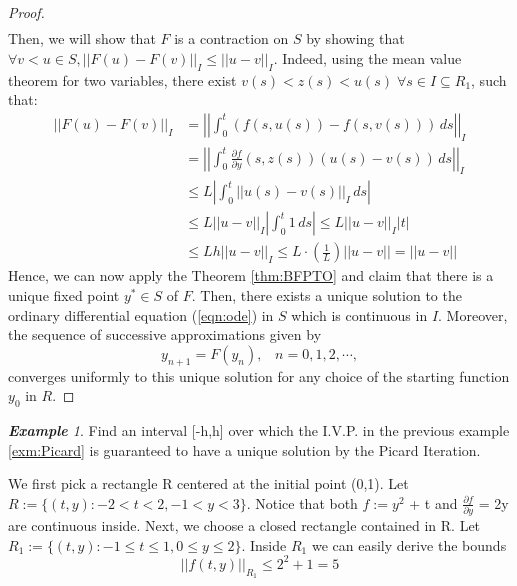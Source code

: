 \documentclass{article}
\theoremstyle{definition}
\theoremstyle{remark}
\theoremstyle{example}
\newtheorem{example}{\textbf{Example}}[section]
\begin{document}
\begin{proof}
\begin{align}
    \end{align}
    Then, we will show that $F$ is a contraction on $S$ by showing that $\forall v < u \in S, \lvert\lvert F(u) - F(v) \rvert\rvert_I \leq \lvert\lvert u - v \rvert\rvert_I$. Indeed, using the mean value theorem for two variables, there exist $v(s) < z(s) < u(s) \; \forall s \in I \subseteq R_1$, such that:
    \begin{align}
        \lvert\lvert F(u) - F(v) \rvert\rvert_I & = \left\lvert\left\lvert \int_{0}^{t}{(f(s,u(s)) - f(s,v(s))) \,ds} \right\rvert\right\rvert_I\\
        & = \left\lvert\left\lvert \int_{0}^{t}\tfrac{\partial f}{\partial y}(s,z(s)){(u(s) - v(s))} \,ds \right\rvert\right\rvert_I\\
        & \leq L\left\lvert\int_{0}^{t}{\lvert\lvert u(s) - v(s) \rvert\rvert_I \,ds}\right\rvert\\
        & \leq L\lvert\lvert u - v \rvert\rvert_{I} \left\lvert \int_{0}^{t}{1}\,ds \right\rvert \leq L\lvert\lvert u - v \rvert\rvert_{I}\lvert t \rvert\\
        & \leq Lh\lvert\lvert u - v \rvert\rvert_{I} \leq L \cdot(\tfrac{1}{L})\lvert\lvert u - v \rvert\rvert = \lvert\lvert u - v \rvert\rvert
    \end{align}
    Hence, we can now apply the Theorem \ref{thm:BFPTO} and claim that there is a unique fixed point $y^{*} \in S$ of $F$. Then, there exists a unique solution to the ordinary differential equation (\ref{eqn:ode}) in $S$ which is continuous in $I$. Moreover, the sequence of successive approximations given by
    \begin{equation}
       y_{n+1} = F(y_n), \; \; \; n = 0, 1, 2, \cdots,
    \end{equation}
    converges uniformly to this unique solution for any choice of the starting function $y_0$ in $R$.
\end{proof}
    
\begin{example}
    Find an interval [-h,h] over which the I.V.P. in the previous example \ref{exm:Picard} is guaranteed to have a unique solution by the Picard Iteration.
\end{example}
We first pick a rectangle R centered at the initial point (0,1). Let $R :=\{(t,y): -2 < t < 2, -1 < y < 3\}$. Notice that both $f:= y^2$ + t and $ \frac{\partial f}{\partial y}$ = 2y are continuous inside.
Next, we choose a closed rectangle contained in R. Let $R_1:=\{(t,y): -1 \leq t \leq 1, 0 \leq y \leq 2\}$. Inside $R_1$ we can easily derive the bounds
\begin{equation}
    \lvert\lvert f(t,y) \rvert\rvert_{R_1} \leq 2^2 + 1 = 5
\end{equation}
\end{document}

